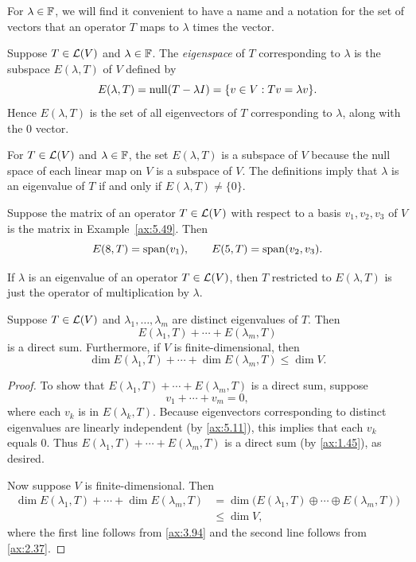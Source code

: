 For $\lambda\in\mathbb{F}$, we will find it convenient to have a name and a notation for
the set of vectors that an operator $T$ maps to $\lambda$ times the vector.

\begin{definition}\label{ax:5.52}
Suppose $T\in\mathcal{L}(V)$ and $\lambda\in\mathbb{F}$. The \emph{eigenspace} of $T$
corresponding to $\lambda$ is the subspace $E(\lambda,T)$ of $V$ defined by
\[ E(\lambda,T)=\operatorname{null}(T-\lambda I)=\{v\in V : Tv=\lambda v\}. \]
Hence $E(\lambda,T)$ is the set of all eigenvectors of $T$ corresponding to
$\lambda$, along with the $0$ vector.
\end{definition}

For $T\in\mathcal{L}(V)$ and $\lambda\in\mathbb{F}$, the set $E(\lambda,T)$ is a subspace of
$V$ because the null space of each linear map on $V$ is a subspace of $V$. The
definitions imply that $\lambda$ is an eigenvalue of $T$ if and only if
$E(\lambda,T)\ne\{0\}$.

\begin{example}\label{ax:5.53}
Suppose the matrix of an operator $T\in\mathcal{L}(V)$ with respect to a basis
$v_1,v_2,v_3$ of $V$ is the matrix in Example~\ref{ax:5.49}. Then
\[ E(8,T)=\operatorname{span}(v_1), \qquad E(5,T)=\operatorname{span}(v_2,v_3). \]
\end{example}

If $\lambda$ is an eigenvalue of an operator $T\in\mathcal{L}(V)$, then $T$ restricted
to $E(\lambda,T)$ is just the operator of multiplication by $\lambda$.

\begin{result}\label{ax:5.54}
Suppose $T\in\mathcal{L}(V)$ and $\lambda_1,\dots,\lambda_m$ are distinct eigenvalues
of $T$. Then
\[ E(\lambda_1,T)+\cdots+E(\lambda_m,T) \]
is a direct sum. Furthermore, if $V$ is finite-dimensional, then
\[ \dim E(\lambda_1,T)+\cdots+\dim E(\lambda_m,T)\le\dim V. \]
\end{result}

\begin{proof}
To show that $E(\lambda_1,T)+\cdots+E(\lambda_m,T)$ is a direct sum, suppose
\[ v_1+\cdots+v_m=0, \]
where each $v_k$ is in $E(\lambda_k,T)$. Because eigenvectors corresponding to
distinct eigenvalues are linearly independent (by \ref{ax:5.11}), this implies
that each $v_k$ equals $0$. Thus $E(\lambda_1,T)+\cdots+E(\lambda_m,T)$ is a
direct sum (by \ref{ax:1.45}), as desired.

Now suppose $V$ is finite-dimensional. Then
\begin{align*}
\dim E(\lambda_1,T)+\cdots+\dim E(\lambda_m,T)
  &= \dim\bigl(E(\lambda_1,T)\oplus\cdots\oplus E(\lambda_m,T)\bigr)\\
  &\le \dim V,
\end{align*}
where the first line follows from \ref{ax:3.94} and the second line follows from
\ref{ax:2.37}.
\end{proof}

